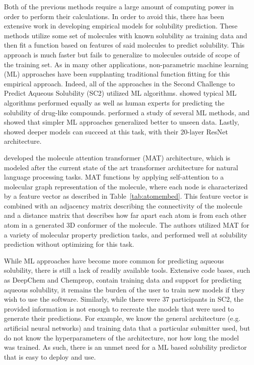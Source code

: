 \documentclass[journal=jmcmar,manuscript=article]{achemso}
\begin{document}
Both of the previous methods require a large amount of computing power in order to perform their calculations.
In order to avoid this, there has been extensive work in developing empirical models for solubility prediction\cite{solrev1,solrev2}.
These methods utilize some set of molecules with known solubility as training data and then fit a function based on features of said molecules to predict solubility.
This approach is much faster but fails to generalize to molecules outside of scope of the training set.
As in many other applications, non-parametric machine learning (ML) approaches have been supplanting traditional function fitting for this empirical approach.
Indeed, all of the approaches in the Second Challenge to Predict Aqueous Solubility (SC2) utilized ML algorithms.\cite{llinas}
\citet{boobier} showed typical ML algorithms performed equally as well as human experts for predicting the solubility of drug-like compounds.
\citet{lovric} performed a study of several ML methods, and showed that simpler ML approaches generalized better to unseen data.
Lastly, \citet{cui} showed deeper models can succeed at this task, with their 20-layer ResNet architecture.

\citet{MAT} developed the molecule attention transformer (MAT) architecture, which is modeled after the current state of the art transformer architecture for natural language processing tasks.
MAT functions by applying self-attention to a molecular graph representation of the molecule, where each node is characterized by a feature vector as described in Table~\ref{tab:atomembed}.
This feature vector is combined with an adjacency matrix describing the connectivity of the molecule and a distance matrix that describes how far apart each atom is from each other atom in a generated 3D conformer of the molecule.
The authors utilized MAT for a variety of molecular property prediction tasks, and performed well at solubility prediction without optimizing for this task.

While ML approaches have become more common for predicting aqueous solubility, there is still a lack of readily available tools.
Extensive code bases, such as DeepChem\cite{deepchem} and Chemprop\cite{chemprop}, contain training data and support for predicting aqueous solubility, it remains the burden of the user to train new models if they wish to use the software.
Similarly, while there were 37 participants in SC2, the provided information is not enough to recreate the models that were used to generate their predictions.
For example, we know the general architecture (e.g. artificial neural networks) and training data that a particular submitter used, but do not know the hyperparameters of the architecture, nor how long the model was trained.
As such, there is an unmet need for a ML based solubility predictor that is easy to deploy and use.
\end{document}
